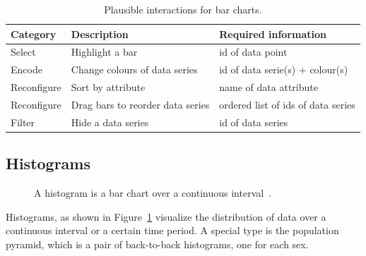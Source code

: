 \begin{table}[H]
  \centering
  \caption{Plausible interactions for bar charts.}
  \label{tab:analysis:bar-charts:interactions}
  \begin{tabularx}{\linewidth}{lXX}
    \bf Category & \bf Description & \bf Required information \\
    \hline
    Select & Highlight a bar & id of data point \\
    Encode & Change colours of data series & id of data serie(s) + colour(s) \\
    Reconfigure & Sort by attribute & name of data attribute \\
    Reconfigure & Drag bars to reorder data series & ordered list of ids of data series \\
    Filter & Hide a data series & id of data series \\
  \end{tabularx}
\end{table}

\subsection{Histograms}

\begin{figure}
  \centering
  \qquad
  \caption{A histogram is a bar chart over a continuous interval~\parencite{VisualizationCatalogue2017}.}%
  \label{fig:analysis:histograms}
\end{figure}

Histograms, as shown in Figure~\ref{fig:analysis:histograms} visualize the distribution of data over a continuous interval or a certain time period.
A special type is the population pyramid, which is a pair of back-to-back histograms, one for each sex.

